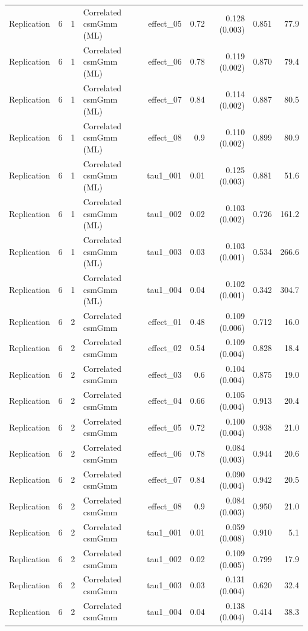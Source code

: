 \begin{longtable}{lcclrrrrr}
Replication & 6 & 1 & Correlated csmGmm (ML) & effect\_05 & 0.72 & 0.128 (0.003) & 0.851 & 77.9\\
Replication & 6 & 1 & Correlated csmGmm (ML) & effect\_06 & 0.78 & 0.119 (0.002) & 0.870 & 79.4\\
Replication & 6 & 1 & Correlated csmGmm (ML) & effect\_07 & 0.84 & 0.114 (0.002) & 0.887 & 80.5\\
Replication & 6 & 1 & Correlated csmGmm (ML) & effect\_08 & 0.9 & 0.110 (0.002) & 0.899 & 80.9\\
Replication & 6 & 1 & Correlated csmGmm (ML) & tau1\_001 & 0.01 & 0.125 (0.003) & 0.881 & 51.6\\
Replication & 6 & 1 & Correlated csmGmm (ML) & tau1\_002 & 0.02 & 0.103 (0.002) & 0.726 & 161.2\\
Replication & 6 & 1 & Correlated csmGmm (ML) & tau1\_003 & 0.03 & 0.103 (0.001) & 0.534 & 266.6\\
Replication & 6 & 1 & Correlated csmGmm (ML) & tau1\_004 & 0.04 & 0.102 (0.001) & 0.342 & 304.7\\
Replication & 6 & 2 & Correlated csmGmm & effect\_01 & 0.48 & 0.109 (0.006) & 0.712 & 16.0\\
Replication & 6 & 2 & Correlated csmGmm & effect\_02 & 0.54 & 0.109 (0.004) & 0.828 & 18.4\\
Replication & 6 & 2 & Correlated csmGmm & effect\_03 & 0.6 & 0.104 (0.004) & 0.875 & 19.0\\
Replication & 6 & 2 & Correlated csmGmm & effect\_04 & 0.66 & 0.105 (0.004) & 0.913 & 20.4\\
Replication & 6 & 2 & Correlated csmGmm & effect\_05 & 0.72 & 0.100 (0.004) & 0.938 & 21.0\\
Replication & 6 & 2 & Correlated csmGmm & effect\_06 & 0.78 & 0.084 (0.003) & 0.944 & 20.6\\
Replication & 6 & 2 & Correlated csmGmm & effect\_07 & 0.84 & 0.090 (0.004) & 0.942 & 20.5\\
Replication & 6 & 2 & Correlated csmGmm & effect\_08 & 0.9 & 0.084 (0.003) & 0.950 & 21.0\\
Replication & 6 & 2 & Correlated csmGmm & tau1\_001 & 0.01 & 0.059 (0.008) & 0.910 & 5.1\\
Replication & 6 & 2 & Correlated csmGmm & tau1\_002 & 0.02 & 0.109 (0.005) & 0.799 & 17.9\\
Replication & 6 & 2 & Correlated csmGmm & tau1\_003 & 0.03 & 0.131 (0.004) & 0.620 & 32.4\\
Replication & 6 & 2 & Correlated csmGmm & tau1\_004 & 0.04 & 0.138 (0.004) & 0.414 & 38.3\\

\end{longtable}
